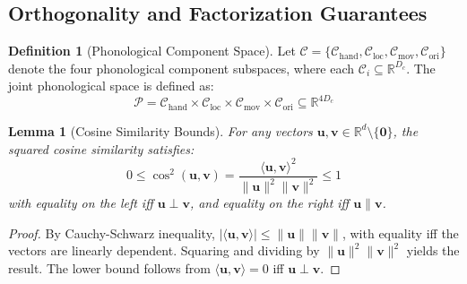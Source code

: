 \documentclass{article}
\newtheorem{lemma}[theorem]{Lemma}
\theoremstyle{definition}
\newtheorem{definition}[theorem]{Definition}
\theoremstyle{remark}
\begin{document}
\subsection{Orthogonality and Factorization Guarantees}

\begin{definition}[Phonological Component Space]
\label{def:component_space}
Let $\mathcal{C} = \{\mathcal{C}_{\text{hand}}, \mathcal{C}_{\text{loc}}, \mathcal{C}_{\text{mov}}, \mathcal{C}_{\text{ori}}\}$ denote the four phonological component subspaces, where each $\mathcal{C}_i \subseteq \mathbb{R}^{D_c}$. The joint phonological space is defined as:
\begin{equation}
\mathcal{P} = \mathcal{C}_{\text{hand}} \times \mathcal{C}_{\text{loc}} \times \mathcal{C}_{\text{mov}} \times \mathcal{C}_{\text{ori}} \subseteq \mathbb{R}^{4D_c}
\end{equation}
\end{definition}

\begin{lemma}[Cosine Similarity Bounds]
\label{lemma:cosine_bounds}
For any vectors $\mathbf{u}, \mathbf{v} \in \mathbb{R}^d \setminus \{\mathbf{0}\}$, the squared cosine similarity satisfies:
\begin{equation}
0 \leq \cos^2(\mathbf{u}, \mathbf{v}) = \frac{\langle \mathbf{u}, \mathbf{v} \rangle^2}{\|\mathbf{u}\|^2 \|\mathbf{v}\|^2} \leq 1
\end{equation}
with equality on the left iff $\mathbf{u} \perp \mathbf{v}$, and equality on the right iff $\mathbf{u} \parallel \mathbf{v}$.
\end{lemma}

\begin{proof}
By Cauchy-Schwarz inequality, $|\langle \mathbf{u}, \mathbf{v} \rangle| \leq \|\mathbf{u}\| \|\mathbf{v}\|$, with equality iff the vectors are linearly dependent. Squaring and dividing by $\|\mathbf{u}\|^2 \|\mathbf{v}\|^2$ yields the result. The lower bound follows from $\langle \mathbf{u}, \mathbf{v} \rangle = 0$ iff $\mathbf{u} \perp \mathbf{v}$.
\end{proof}
\end{document}
